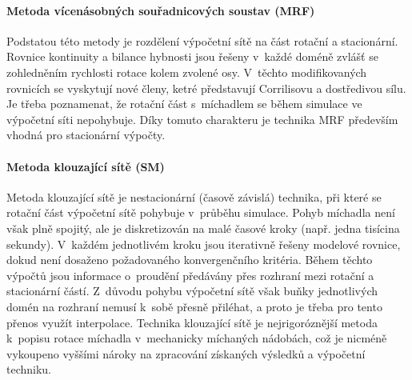 \paragraph{Metoda vícenásobných souřadnicových soustav (MRF)}
Podstatou této metody je rozdělení výpočetní sítě na část rotační a stacionární. Rovnice kontinuity a bilance hybnosti jsou řešeny v~každé doméně zvlášť se zohledněním rychlosti rotace kolem zvolené osy. V~těchto modifikovaných rovnicích se vyskytují nové členy, ketré představují Corrilisovu a dostředivou sílu. Je třeba poznamenat, že rotační část s~míchadlem se během simulace ve výpočetní síti nepohybuje. Díky tomuto charakteru je technika MRF především vhodná pro stacionární výpočty.

\paragraph{Metoda klouzající sítě (SM)}
Metoda klouzající sítě je nestacionární (časově zá\-vis\-lá) technika, při které se rotační část výpočetní sítě pohybuje v~průběhu simulace. Pohyb míchadla není však plně spojitý, ale je diskretizován na malé časové kroky (např. jedna tisícina sekundy). V~každém jednotlivém kroku jsou iterativně řešeny modelové rovnice, dokud není dosaženo požadovaného konvergenčního kritéria. Během těchto výpočtů jsou informace o~proudění předávány přes rozhraní mezi rotační a stacionární částí. Z~důvodu pohybu výpočetní sítě však buňky jednotlivých domén na rozhraní nemusí k~sobě přesně přiléhat, a proto je třeba pro tento přenos využít interpolace. Technika klouzající sítě je nejrigoróznější metoda k~popisu rotace míchadla v~mechanicky míchaných nádobách, což je nicméně vykoupeno vyššími nároky na zpracování získaných výsledků a výpočetní techniku. 

